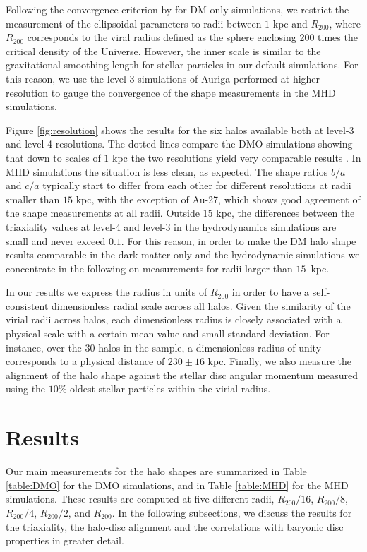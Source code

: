\documentclass[usenatbib]{mnras}
\begin{document}
Following the convergence criterion by \cite{VeraCiro11} for DM-only simulations,
we restrict the measurement of the ellipsoidal parameters to radii
between $1$ kpc and $R_{200}$, where  $R_{200}$ corresponds to the viral radius
defined as the sphere  enclosing 200 times the critical density of the
Universe. However, the inner scale is similar to the gravitational smoothing length
for stellar particles in our default simulations.
For this reason, we use the level-3 simulations of Auriga performed at higher
resolution to gauge the convergence of the shape measurements in the
MHD simulations.

Figure \ref{fig:resolution} shows the results for the six halos
available both at level-3 and level-4 resolutions.
The dotted lines compare the DMO simulations showing that down to
scales of $1$ kpc the two resolutions yield very comparable results
\citep{VeraCiro11}. 
In MHD simulations the situation is less clean, as expected. 
The shape ratios $b/a$ and $c/a$ typically start to differ
from each other for different resolutions at radii smaller than $15$ kpc, 
with the exception of Au-27, which  shows good agreement of the shape 
measurements at all radii. Outside $15$ kpc, the differences between the triaxiality values at
level-4 and level-3 in the hydrodynamics simulations are small and never exceed $0.1$. 
For this reason, in order to make the DM halo shape results comparable
in the dark matter-only and the hydrodynamic simulations we concentrate in 
the following on measurements for radii larger  than $15$~kpc.


In our results we express the radius in units  of $R_{200}$ in
order to have a self-consistent dimensionless radial scale across all
halos. Given the similarity of the virial radii across halos, each dimensionless radius is
closely associated with a physical scale with a certain mean value and small standard deviation.
For instance, over the 30 halos in the sample, a dimensionless
radius of unity corresponds to a physical distance of $230\pm 16$
kpc.   Finally, we also measure the alignment of the halo shape against the
stellar disc angular momentum measured using the $10\%$ oldest stellar
particles within the virial radius.    


\section{Results}
\label{sec:results}

Our main measurements for the halo shapes are summarized in Table \ref{table:DMO} for the
DMO simulations, and in Table \ref{table:MHD} for the MHD simulations.
These results are computed at five different radii, $R_{200}/16$,
$R_{200}/8$, $R_{200}/4$, $R_{200}/2$, and $R_{200}$.
In the following subsections, we discuss 
the results for the triaxiality, the halo-disc alignment and the
correlations with baryonic disc properties in greater detail.
\end{document}
